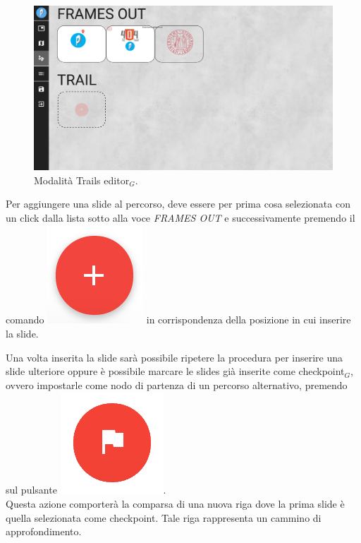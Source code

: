 \begin{figure}[!h]
\begin{center}
\includegraphics[scale=0.35]{img/edit_trail.png}
\caption{Modalità Trails editor$_G$.}
\end{center}
\end{figure}

\noindent Per aggiungere una slide al percorso, deve essere per prima cosa selezionata con un click dalla lista sotto alla voce \emph{FRAMES OUT} e successivamente premendo il comando \includegraphics[scale=0.4]{img/add.png} in corrispondenza della posizione in cui inserire la slide.

Una volta inserita la slide sarà possibile ripetere la procedura per inserire una slide ulteriore oppure è possibile marcare le slides già inserite come checkpoint$_G$, ovvero impostarle come nodo di partenza di un percorso alternativo, premendo sul pulsante \includegraphics[scale=0.4]{img/checkpoint.png}.\\
Questa azione comporterà la comparsa di una nuova riga dove la prima slide è quella selezionata come checkpoint. Tale riga rappresenta un cammino di approfondimento.

